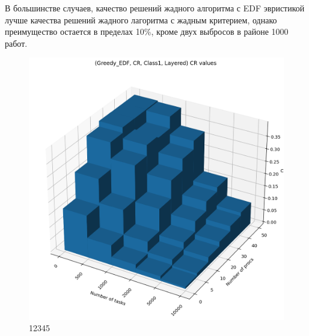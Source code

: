 В большинстве случаев, качество решений жадного алгоритма с EDF эвристикой лучше качества решений жадного лагоритма с жадным критерием, однако преимущество остается в пределах 10\%, кроме двух выбросов в районе 1000 работ. 

\begin{figure}[!htbp]
    \centering
    \includegraphics[width=\textwidth]{imgs/layered_class_1/CR_EDF/cr_3d.png}
    \caption{12345}
\end{figure}

